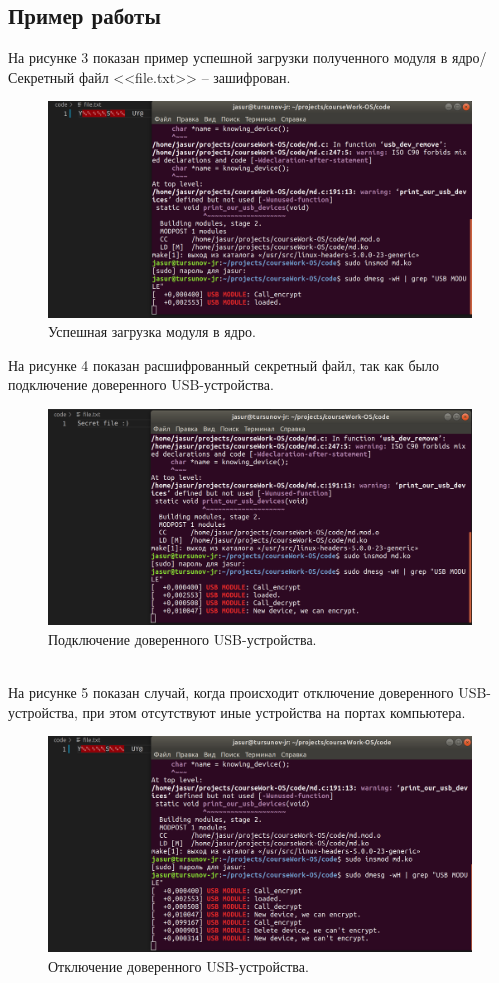\documentclass[a4paper, 10pt]{article}
\begin{document}
	\subsection{Пример работы}
	\hspace*{5mm}На рисунке 3 показан пример успешной загрузки полученного модуля в ядро/ Секретный файл <<file.txt>> -- зашифрован.
	\begin{figure}[h!]
		\centering
		\includegraphics[scale=0.2]{1}
		\centering\caption{Успешная загрузка модуля в ядро.}
	\end{figure}
	\clearpage
	\newpage
	На рисунке 4 показан расшифрованный секретный файл, так как было подключение доверенного USB-устройства.
	\begin{figure}[h!]
		\centering
		\includegraphics[scale=0.2]{2}
		\centering\caption{Подключение доверенного USB-устройства.}
	\end{figure}
	\\ \hspace*{5mm} На рисунке 5 показан случай, когда происходит отключение доверенного USB-устройства, при этом отсутствуют иные устройства на портах компьютера.
	\begin{figure}[h!]
		\centering
		\includegraphics[scale=0.2]{3}
		\centering\caption{Отключение доверенного USB-устройства.}
	\end{figure}
\end{document}
